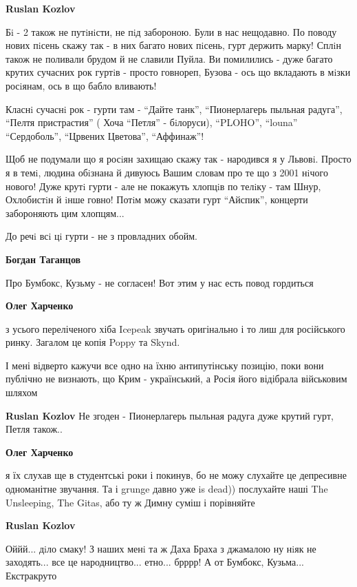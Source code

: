 \begin{itemize}
\begin{itemize}
\textbf{Ruslan Kozlov} 

Бi - 2 також не путiнiсти, не пiд забороною. Були в нас нещодавно. По поводу нових
пiсень скажу так - в них багато нових пiсень, гурт держить марку! Сплiн також не
поливали брудом й не славили Пуйла. Ви помилились - дуже багато крутих сучасних
рок гуртiв - просто говнореп, Бузова - ось що вкладають в мiзки росiянам, ось в
що бабло вливають!

Класнi сучаснi рок - гурти там - \enquote{Дайте танк}, \enquote{Пионерлагерь пыльная радуга}, 
\enquote{Пелтя пристрастия} ( Хоча \enquote{Петля} - бiлоруси), \enquote{PLOHO},
\enquote{louna} \enquote{Сердоболь}, \enquote{Црвених Цветова}, \enquote{Аффинаж}!

Щоб не подумали що я росiян захищаю скажу так - народився я у Львовi. Просто я
в темi, людина обiзнана й дивуюсь Вашим словам про те що з 2001 нiчого нового!
Дуже крутi гурти - але не покажуть хлопцiв по телiку - там Шнур, Охлобистiн й
iнше говно! Потiм можу сказати гурт \enquote{Айспик}, концерти забороняють цим
хлопцям...

До речi всi цi гурти - не з провладних обойм.

\textbf{Богдан Таганцов} 

Про Бумбокс, Кузьму - не согласен! Вот этим у нас есть повод гордиться

\textbf{Олег Харченко} 

з усього переліченого хіба Icepeak звучать оригінально і то лиш для російського
ринку. Загалом це копія Poppy та Skynd.

І мені відверто кажучи все одно на їхню антипутінську позицію, поки вони
публічно не визнають, що Крим - український, а Росія його відібрала військовим
шляхом

\textbf{Ruslan Kozlov} Не згоден - Пионерлагерь пыльная радуга дуже крутий гурт, Петля також..

\textbf{Олег Харченко} 

я їх слухав ще в студентські роки і покинув, бо не можу слухайте це депресивне
одноманітне звучання. Та і grunge давно уже is dead)) послухайте наші The
Unsleeping, The Gitas, або ту ж Димну суміш і порівняйте


\textbf{Ruslan Kozlov} 

Оййй... дiло смаку! З наших менi та ж Даха Браха з джамалою ну нiяк не
заходять... все це народництво... етно... брррр! А от Бумбокс,
Кузьма... Екстракруто


\end{itemize}
\end{itemize}
